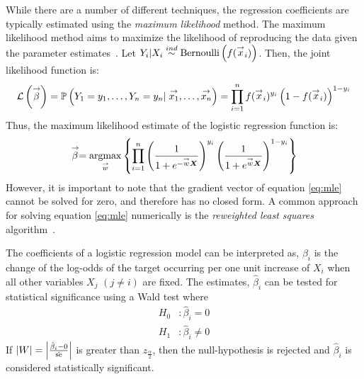 While there are a number of different techniques, the regression coefficients are typically estimated using the \emph{maximum likelihood} method. The maximum likelihood method aims to maximize the likelihood of reproducing the data given the parameter estimates~\citep{An-Introduction-to-Logistic-Regression-Analysis-and-Reporting}. Let $Y_i | X_i \stackrel{ind}{\sim} \mathrm{Bernoulli} \left( f(\stackrel{\rightarrow}{x}_i) \right)$. Then, the joint likelihood function is:
\begin{align*}
    \mathcal{L} \left( \stackrel{\rightarrow}{\beta} \right) =
    \mathbb{P} \left( Y_1 = y_1, \dots, Y_n = y_n | \stackrel{\rightarrow}{x_1}, \dots, \stackrel{\rightarrow}{x_n} \right)
    = \prod_{i=1}^n f(\stackrel{\rightarrow}{x}_i)^{y_i} \left( 1 - f(\stackrel{\rightarrow}{x}_i) \right)^{1-y_i}
\end{align*}
Thus, the maximum likelihood estimate of the logistic regression function is:
\begin{align}
    \stackrel{\rightarrow}{\beta} = \underset{\stackrel{\rightarrow}{w}}{\mathrm{argmax}} \left\{ \prod_{i=1}^n \left( \frac{1}{1+e^{-\stackrel{\rightarrow}{w}\boldsymbol{X}}} \right)^{y_i} \left( \frac{1}{1+e^{\stackrel{\rightarrow}{w}\boldsymbol{X}}} \right)^{1-y_i} \label{eq:mle} \right\}
\end{align}
However, it is important to note that the gradient vector of equation \ref{eq:mle} cannot be solved for zero, and therefore has no closed form.
A common approach for solving equation \ref{eq:mle} numerically is the \emph{reweighted least squares} algorithm~\citep{Wasserman2004}.

The coefficients of a logistic regression model can be interpreted as, $\beta_i$ is the change of the log-odds of the target occurring per one unit increase of $X_i$ when all other variables $X_j$ $(j \neq i)$ are fixed. 
The estimates, $\hat{\beta}_i$ can be tested for statistical significance using a Wald test where
\begin{align*}
    H_0&: \hat{\beta}_i = 0 \\
    H_1&: \hat{\beta}_i \neq 0
\end{align*}
If $\left| W \right| = \left| \frac{\hat{\beta}_i - 0}{\hat{\text{se}}} \right|$ is greater than $z_{\frac{\alpha}{2}}$, then the null-hypothesis is rejected and $\hat{\beta}_i$ is considered statistically significant.